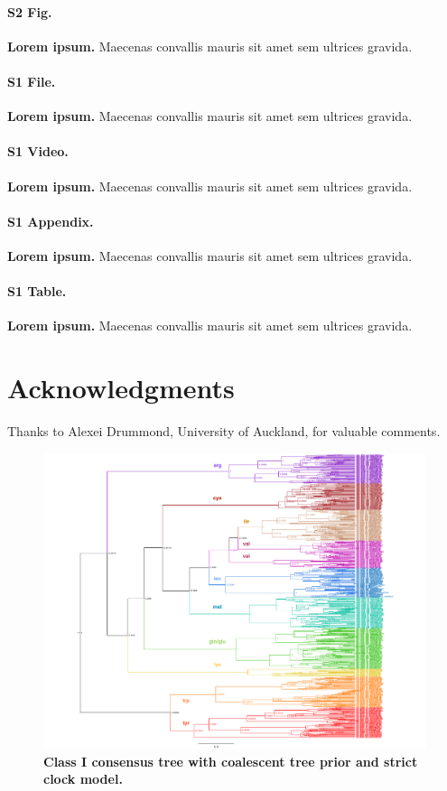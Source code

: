 \documentclass[10pt,letterpaper]{article}
\begin{document}
\paragraph*{S2 Fig.}
\label{S2_Fig}
{\bf Lorem ipsum.} Maecenas convallis mauris sit amet sem ultrices gravida. 

\paragraph*{S1 File.}
\label{S1_File}
{\bf Lorem ipsum.}  Maecenas convallis mauris sit amet sem ultrices gravida. 

\paragraph*{S1 Video.}
\label{S1_Video}
{\bf Lorem ipsum.}  Maecenas convallis mauris sit amet sem ultrices gravida. 

\paragraph*{S1 Appendix.}
\label{S1_Appendix}
{\bf Lorem ipsum.} Maecenas convallis mauris sit amet sem ultrices gravida. 

\paragraph*{S1 Table.}
\label{S1_Table}
{\bf Lorem ipsum.} Maecenas convallis mauris sit amet sem ultrices gravida. 

\section*{Acknowledgments}
Thanks to Alexei Drummond, University of Auckland, for valuable comments.

\nolinenumbers

%
%
\begin{figure}
  \caption{\bf Class I consensus tree with coalescent tree prior and strict clock model.}
  \centering
    \includegraphics[width=\textwidth]{ClassI_Coalescent_1}
\end{figure}
\end{document}
